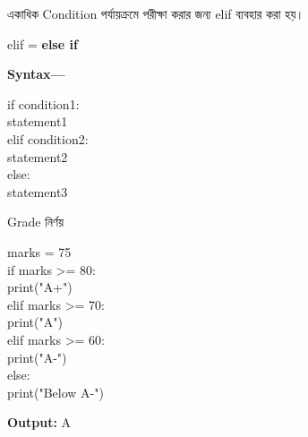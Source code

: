 

একাধিক Condition পর্যায়ক্রমে পরীক্ষা করার জন্য
\textenglish{\ttfamily elif}
ব্যবহার করা হয়।

\begin{center}
\textenglish{\ttfamily elif}
=
\textbf{else if}
\end{center}

\textbf{Syntax—}

\begin{codebox}
\begin{english}
\ttfamily
if condition1:\\
\hspace*{4mm}statement1\\
elif condition2:\\
\hspace*{4mm}statement2\\
else:\\
\hspace*{4mm}statement3
\end{english}
\end{codebox}

\begin{examplebox}{Grade নির্ণয়}

\begin{codebox}
\begin{english}
\ttfamily
marks = 75\\
if marks >= 80:\\
\hspace*{4mm}print("A+")\\
elif marks >= 70:\\
\hspace*{4mm}print("A")\\
elif marks >= 60:\\
\hspace*{4mm}print("A-")\\
else:\\
\hspace*{4mm}print("Below A-")
\end{english}
\end{codebox}

\textbf{Output:}
\textenglish{\ttfamily A}

\end{examplebox}


